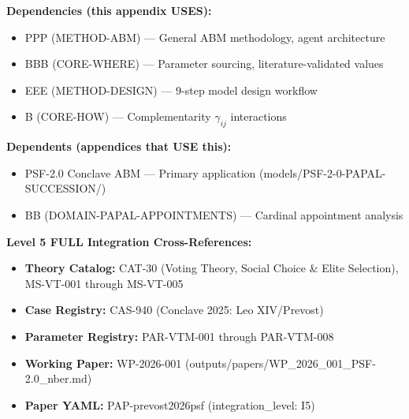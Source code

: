%
%
%


\begin{tcolorbox}[colback=blue!5!white, colframe=blue!75!black, title=Cross-Reference Map]
\small
\textbf{Dependencies (this appendix USES):}
\begin{itemize}[nosep]
\item PPP (METHOD-ABM) --- General ABM methodology, agent architecture
\item BBB (CORE-WHERE) --- Parameter sourcing, literature-validated values
\item EEE (METHOD-DESIGN) --- 9-step model design workflow
\item B (CORE-HOW) --- Complementarity $\gamma_{ij}$ interactions
\end{itemize}

\textbf{Dependents (appendices that USE this):}
\begin{itemize}[nosep]
\item PSF-2.0 Conclave ABM --- Primary application (models/PSF-2-0-PAPAL-SUCCESSION/)
\item BB (DOMAIN-PAPAL-APPOINTMENTS) --- Cardinal appointment analysis
\end{itemize}

\textbf{Level 5 FULL Integration Cross-References:}
\begin{itemize}[nosep]
\item \textbf{Theory Catalog:} CAT-30 (Voting Theory, Social Choice \& Elite Selection), MS-VT-001 through MS-VT-005
\item \textbf{Case Registry:} CAS-940 (Conclave 2025: Leo XIV/Prevost)
\item \textbf{Parameter Registry:} PAR-VTM-001 through PAR-VTM-008
\item \textbf{Working Paper:} WP-2026-001 (outputs/papers/WP\_2026\_001\_PSF-2.0\_nber.md)
\item \textbf{Paper YAML:} PAP-prevost2026psf (integration\_level: I5)
\end{itemize}
\end{tcolorbox}

